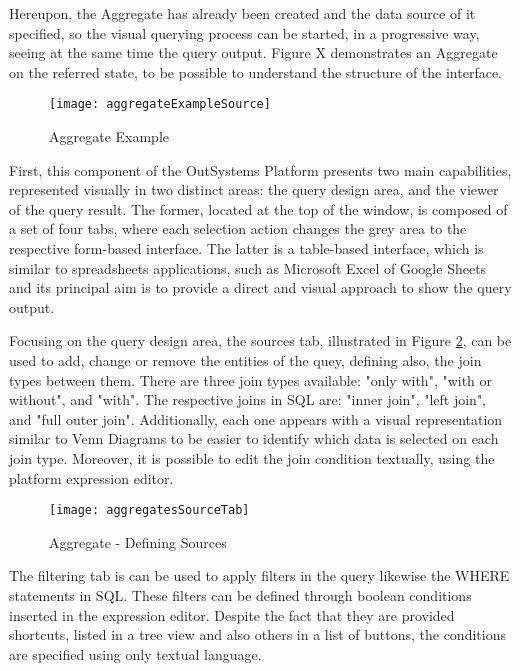 Hereupon, the Aggregate has already been created and the data source of it specified, so the visual querying process can be started, in a progressive way, seeing at the same time the query output. Figure X demonstrates an Aggregate on the referred state, to be possible to understand the structure of the interface.

\begin{figure}[htbp]
	\centering
	\texttt{[image: aggregateExampleSource]}
	\caption{Aggregate Example}
	\label{fig:aggregate_created}
\end{figure}

First, this component of the OutSystems Platform presents two main capabilities, represented visually in two distinct areas: the query design area, and the viewer of the query result. The former, located at the top of the window, is composed of a set of four tabs, where each selection action changes the grey area to the respective form-based interface. The latter is a table-based interface, which is similar to spreadsheets applications, such as Microsoft Excel \cite{microsoftExcel} of Google Sheets \cite{googleSheets} and its principal aim is to provide a direct and visual approach to show the query output.

Focusing on the query design area, the sources tab, illustrated in Figure \ref{fig:aggregates_source_tab}, can be used to add, change or remove the entities of the quey, defining also, the join types between them. There are three join types available: "only with", "with or without", and "with". The respective joins in SQL are: "inner join", "left join", and "full outer join". Additionally, each one appears with a visual representation similar to Venn Diagrams \cite{venn1880diagrams} to be easier to identify which data is selected on each join type. Moreover, it is possible to edit the join condition textually, using the platform expression editor.

\begin{figure}[htbp]
	\centering
	\texttt{[image: aggregatesSourceTab]}
	\caption{Aggregate - Defining Sources}
	\label{fig:aggregates_source_tab}
\end{figure}

The filtering tab is can be used to apply filters in the query likewise the WHERE statements in SQL. These filters can be defined through boolean conditions inserted in the expression editor. Despite the fact that they are provided shortcuts, listed in a tree view and also others in a list of buttons, the conditions are specified using only textual language. 

